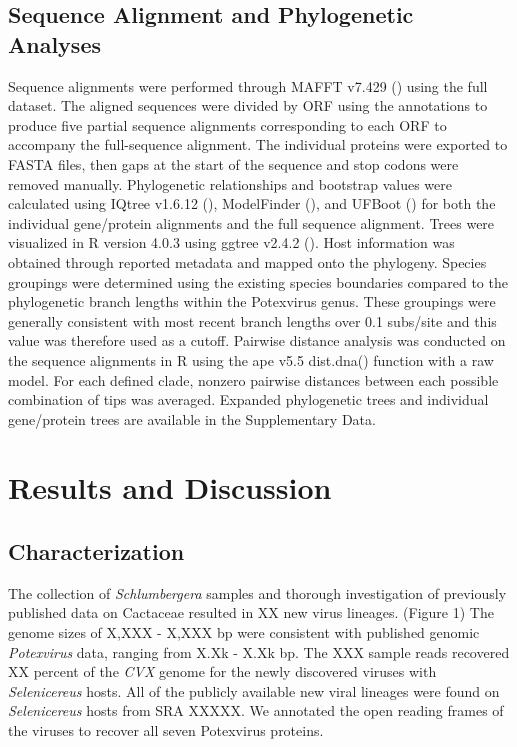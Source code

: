 \documentclass[11pt,letterpaper,titlepage]{article}
\begin{document}
\begin{linenumbers}
\subsection*{Sequence Alignment and Phylogenetic Analyses}
Sequence alignments were performed through MAFFT v7.429 (\citep{katoh_mafft_2002}) using the full dataset.
The aligned sequences were divided by ORF using the annotations to produce five partial sequence alignments corresponding to each ORF to accompany the full-sequence alignment. 
The individual proteins were exported to FASTA files, then gaps at the start of the sequence and stop codons were removed manually. 
Phylogenetic relationships and bootstrap values were calculated using IQtree v1.6.12 (\citep{nguyen_iq-tree_2015}), ModelFinder (\citep{kalyaanamoorthy_modelfinder_2017}), and UFBoot (\citep{hoang_ufboot2_2018}) for both the individual gene/protein alignments and the full sequence alignment. 
Trees were visualized in R version 4.0.3 using ggtree v2.4.2 (\citep{yu_ggtree_2017}). 
Host information was obtained through reported metadata and mapped onto the phylogeny. 
Species groupings were determined using the existing species boundaries compared to the phylogenetic branch lengths within the Potexvirus genus. 
These groupings were generally consistent with most recent branch lengths over 0.1 subs/site and this value was therefore used as a cutoff. 
Pairwise distance analysis was conducted on the sequence alignments in R using the ape v5.5  dist.dna() function with a raw model. 
For each defined clade, nonzero pairwise distances between each possible combination of tips was averaged. 
Expanded phylogenetic trees and individual gene/protein trees are available in the Supplementary Data.




\section*{Results and Discussion}
\subsection*{Characterization}
The collection of \textit{Schlumbergera} samples and thorough investigation of previously published data on Cactaceae resulted in XX new virus lineages. (Figure 1)
The genome sizes of X,XXX - X,XXX bp were consistent with published genomic \textit{Potexvirus} data, ranging from X.Xk - X.Xk bp.
The XXX sample reads recovered XX percent of the \textit{CVX} genome for the newly discovered viruses with \textit{Selenicereus} hosts. 
All of the publicly available new viral lineages were found on \textit{Selenicereus} hosts from SRA XXXXX.
We annotated the open reading frames of the viruses to recover all seven Potexvirus proteins.


\end{linenumbers}
\end{document}
